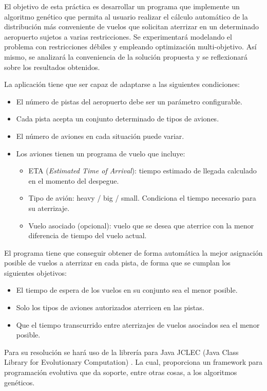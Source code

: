 \documentclass[a4paper,12pt,titlepage]{article}
\begin{document}
El objetivo de esta práctica es desarrollar un programa que implemente un algoritmo genético que permita al usuario realizar el cálculo automático de la distribución más conveniente de vuelos que solicitan aterrizar en un determinado aeropuerto sujetos a varias restricciones. Se experimentará modelando el problema con restricciones débiles y empleando optimización multi-objetivo. Así mismo, se analizará la conveniencia de la solución propuesta y se reflexionará sobre los resultados obtenidos.

La aplicación tiene que ser capaz de adaptarse a las siguientes condiciones:

\begin{itemize}[noitemsep]
	\item El número de pistas del aeropuerto debe ser un parámetro configurable.
	\item Cada pista acepta un conjunto determinado de tipos de aviones.	
	\item El número de aviones en cada situación puede variar.
	\item Los aviones tienen un programa de vuelo que incluye:
	\begin{itemize}[noitemsep]
		\item ETA (\textit{Estimated Time of Arrival}): tiempo estimado de llegada calculado en el momento del despegue.
		\item Tipo de avión: heavy / big / small. Condiciona el tiempo necesario para su aterrizaje.
	  \item Vuelo asociado (opcional): vuelo que se desea que aterrice con la menor diferencia de tiempo del vuelo actual.
	\end{itemize}
\end{itemize}

El programa tiene que conseguir obtener de forma automática la mejor asignación posible de vuelos a aterrizar en cada pista, de forma que se cumplan los siguientes objetivos:

\begin{itemize}[noitemsep]
	\item El tiempo de espera de los vuelos en su conjunto sea el menor posible.
	\item Solo los tipos de aviones autorizados aterricen en las pistas.
	\item Que el tiempo transcurrido entre aterrizajes de vuelos asociados sea el menor posible. 
\end{itemize}

Para su resolución se hará uso de la librería para Java JCLEC (Java Class Library for Evolutionary Computation) \citep{web:jclec}. La cual, proporciona un framework para programación evolutiva que da soporte, entre otras cosas, a los algoritmos genéticos.
\end{document}
